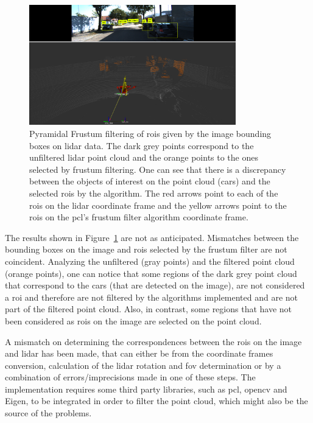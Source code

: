 \begin{figure}[!ht]
	\centering
	\includegraphics[width=0.8\textwidth]{img/image-object-to-point-cloud/bbox_correspondences_on_kitti.png}
	\caption[Points corresponding to the image objects' bounding boxes, using the frustum filtering correspondences algorithm.]{Pyramidal Frustum filtering of \acp{roi} given by the image bounding boxes on \ac{lidar} data. The dark grey points correspond to the unfiltered \ac{lidar} point cloud and the orange points to the ones selected by frustum filtering. One can see that there is a discrepancy between the objects of interest on the point cloud (cars) and the selected \acp{roi} by the algorithm. The red arrows point to each of the \acp{roi} on the \ac{lidar} coordinate frame and the yellow arrows point to the \acp {roi} on the \ac{pcl}'s frustum filter algorithm coordinate frame.}
	\label{fig:bbox-correspondences-on-kitti}
\end{figure}

The results shown in Figure~\ref{fig:bbox-correspondences-on-kitti} are not as anticipated. Mismatches between the bounding boxes on the image and \acp{roi} selected by the frustum filter are not coincident. Analyzing the unfiltered (gray points) and the filtered point cloud (orange points), one can notice that some regions of the dark grey point cloud that correspond to the cars (that are detected on the image), are not considered a \ac{roi} and therefore are not filtered by the algorithms implemented and are not part of the filtered point cloud. Also, in contrast, some regions that have not been considered as \acp{roi} on the image are selected on the point cloud.

A mismatch on determining the correspondences between the \acp{roi} on the image and \ac{lidar} has been made, that can either be from the coordinate frames conversion, calculation of the \ac{lidar} rotation and \ac{fov} determination or by a combination of errors/imprecisions made in one of these steps. The implementation requires some third party libraries, such as \ac{pcl}, \ac{opencv} and Eigen, to be integrated in order to filter the point cloud, which might also be the source of the problems.

